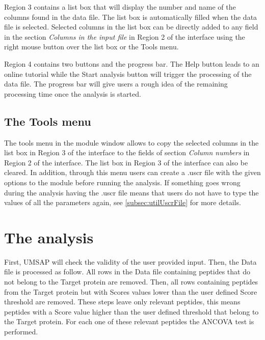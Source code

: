 Region \num{3} contains a list box that will display the number and name of the columns found in the data file. The list box is automatically filled when the data file is selected. Selected columns in the list box can be directly added to any field in the section \textit{Columns in the input file} in Region \num{2} of the interface using the right mouse button over the list box or the Tools menu.

Region \num{4} contains two buttons and the progress bar. The Help button leads to an online tutorial while the Start analysis button will trigger the processing of the data file. The progress bar will give users a rough idea of the remaining processing time once the analysis is started.

\subsection{The Tools menu}

The tools menu in the module window allows to copy the selected columns in the list box in Region \num{3} of the interface to the fields of section \textit{Column numbers} in Region \num{2} of the interface. The list box in Region \num{3} of the interface can also be cleared. In addition, through this menu users can create a .uscr file with the given options to the module before running the analysis. If something goes wrong during the analysis having the .uscr file means that users do not have to type the values of all the parameters again, see \autoref{subsec:utilUscrFile} for more details.   

\section{The analysis}

First, UMSAP will check the validity of the user provided input. Then, the Data file is processed as follow. All rows in the Data file containing peptides that do not belong to the Target protein are removed. Then, all rows containing peptides from the Target protein but with Scores values lower than the user defined Score threshold are removed. These steps leave only relevant peptides, this means peptides with a Score value higher than the user defined threshold that belong to the Target protein. For each one of these relevant peptides the ANCOVA test is performed. 

